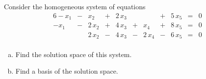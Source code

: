 
\begin{exerciseStatement}


Consider the homogeneous system of equations 
\begin{alignat*}{6} -x_{1} &-& x_{2} &+& 2 \, x_{3} & &  &+& 5 \, x_{5} &=& 0 \\-x_{1} &-& 2 \, x_{2} &+& 4 \, x_{3} &+& x_{4} &+& 8 \, x_{5} &=& 0 \\ & & 2 \, x_{2} &-& 4 \, x_{3} &-& 2 \, x_{4} &-& 6 \, x_{5} &=& 0 \\ \end{alignat*}
            


\begin{enumerate}[(a)]
\item  Find the solution space of this system.
\item  Find a basis of the solution space.
\end{enumerate}
    
\end{exerciseStatement}
    
